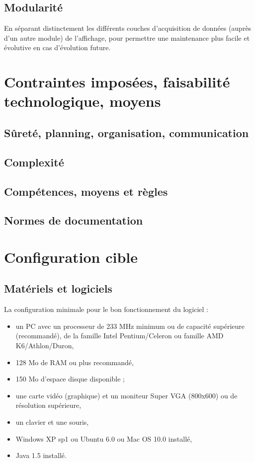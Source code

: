 \subsection{Modularité}
En séparant distinctement les différents couches d'acquisition de données (auprès d'un autre module) de l'affichage, pour permettre une maintenance plus facile et évolutive en cas d'évolution future.

\section{Contraintes imposées, faisabilité technologique, moyens}
\subsection{Sûreté, planning, organisation, communication}
\subsection{Complexité}
\subsection{Compétences, moyens et règles}
\subsection{Normes de documentation}

\section{Configuration cible}
\subsection{Matériels et logiciels}
La configuration minimale pour le bon fonctionnement du logiciel : 
\begin{itemize}
	\item un PC avec un processeur de 233 MHz minimum ou de capacité supérieure (recommandé), de la famille Intel Pentium/Celeron ou famille AMD K6/Athlon/Duron,
	\item 128 Mo de RAM ou plus recommandé,
	\item 150 Mo d'espace disque disponible ;
	\item une carte vidéo (graphique) et un moniteur Super VGA (800x600) ou de résolution supérieure,
	\item un clavier et une souris,
	\item Windows XP sp1 ou Ubuntu 6.0 ou Mac OS 10.0 installé,
	\item Java 1.5 installé.
\end{itemize}

